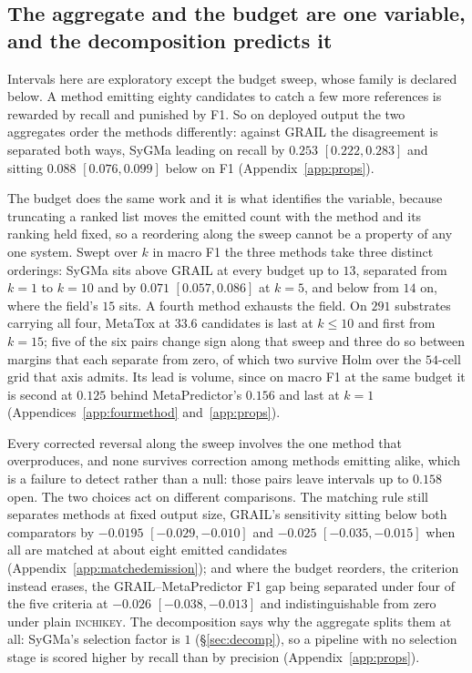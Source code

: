 \subsection{The aggregate and the budget are one variable, and the decomposition predicts it}
\label{sec:metric}

Intervals here are exploratory except the budget sweep, whose family is declared below. A method emitting
eighty candidates to catch a few more references is rewarded by recall and punished by F1. So on
deployed output the two aggregates order the methods differently: against GRAIL the disagreement is
separated both ways, SyGMa leading on recall by $0.253$ $[0.222,0.283]$ and sitting $0.088$
$[0.076,0.099]$ below on F1 (Appendix~\ref{app:props}).

The budget does the same work and it is what identifies the variable, because truncating a ranked
list moves the emitted count with the method and its ranking held fixed, so a reordering along the
sweep cannot be a property of any one system. Swept over $k$ in macro F1 the three methods take
three distinct orderings: SyGMa sits above GRAIL at every budget up to $13$, separated from $k=1$ to
$k=10$ and by $0.071$ $[0.057,0.086]$ at $k=5$, and below from $14$ on, where the field's $15$ sits.
A fourth method exhausts the field. On $291$ substrates carrying all four, MetaTox at $33.6$
candidates is last at $k\le10$ and first from $k=15$; five of the six pairs change sign along that
sweep and three do so between margins that each separate from zero, of which two survive Holm over
the $54$-cell grid that axis admits. Its lead is volume, since on macro F1 at the same budget it is
second at $0.125$ behind MetaPredictor's $0.156$ and last at $k=1$
(Appendices~\ref{app:fourmethod} and~\ref{app:props}).

Every corrected reversal along the sweep involves the one method that overproduces, and none
survives correction among methods emitting alike, which is a failure to detect rather than a null:
those pairs leave intervals up to $0.158$ open. The two choices act on different comparisons. The
matching rule still separates methods at fixed output size, GRAIL's sensitivity sitting below both
comparators by $-0.0195$ $[-0.029,-0.010]$ and $-0.025$ $[-0.035,-0.015]$ when all are matched at
about eight emitted candidates (Appendix~\ref{app:matchedemission}); and where the budget reorders,
the criterion instead erases, the GRAIL--MetaPredictor F1 gap being separated under four of the five
criteria at $-0.026$ $[-0.038,-0.013]$ and indistinguishable from zero under plain
\textsc{inchikey}. The decomposition says why the aggregate splits them at all: SyGMa's selection
factor is $1$ (\S\ref{sec:decomp}), so a pipeline with no selection stage is scored higher by recall than by precision (Appendix~\ref{app:props}).


